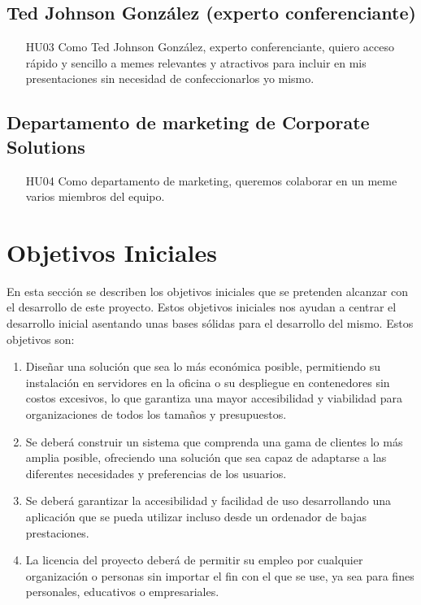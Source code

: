     \subsection{Ted Johnson González (experto conferenciante)}

        \begin{enumerate}
            \item [HU03] Como Ted Johnson González, experto conferenciante, quiero acceso rápido y sencillo a memes relevantes y atractivos para incluir en mis presentaciones sin necesidad de confeccionarlos yo mismo.
        \end{enumerate}

    \subsection{Departamento de marketing de Corporate Solutions}

        \begin{enumerate}
            \item [HU04] Como departamento de marketing, queremos colaborar en un meme varios miembros del equipo.
        \end{enumerate}

\section{Objetivos Iniciales}

En esta sección se describen los objetivos iniciales que se pretenden alcanzar con el desarrollo de este proyecto. Estos objetivos iniciales nos ayudan a centrar el desarrollo inicial asentando unas bases sólidas para el desarrollo del mismo. Estos objetivos son:

\begin{enumerate}
    \item Diseñar una solución que sea lo más económica posible, permitiendo su instalación en servidores en la oficina o su despliegue en contenedores sin costos excesivos, lo que garantiza una mayor accesibilidad y viabilidad para organizaciones de todos los tamaños y presupuestos.
    \item Se deberá construir un sistema que comprenda una gama de clientes lo más amplia posible, ofreciendo una solución que sea capaz de adaptarse a las diferentes necesidades y preferencias de los usuarios.
    \item Se deberá garantizar la accesibilidad y facilidad de uso desarrollando una aplicación que se pueda utilizar incluso desde un ordenador de bajas prestaciones.
    \item La licencia del proyecto deberá de permitir su empleo por cualquier organización o personas sin importar el fin con el que se use, ya sea para fines personales, educativos o empresariales.
\end{enumerate}

